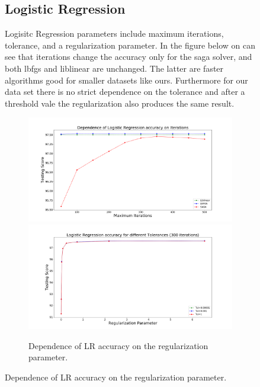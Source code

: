 \begin{figure}[h]
\subsection{Logistic Regression}

Logisitc Regression parameters include maximum iterations, tolerance, and a regularization parameter. In the figure below on can see that iterations change the accuracy only for the saga solver, and both lbfgs and liblinear are unchanged. The latter are faster algorithms good for smaller datasets like ours. Furthermore for our data set there is no strict dependence on the tolerance and after a threshold vale the regularization also produces the same result.


\begin{figure}[h]
\includegraphics[width=\twopicsp\textwidth]{plots/solver.pdf}
\includegraphics[width=\twopicsp\textwidth]{plots/tol.png}
\caption{Dependence of LR accuracy on the regularization parameter.
}
\label{fig:LR_accuracy}
\end{figure}


\end{figure}
